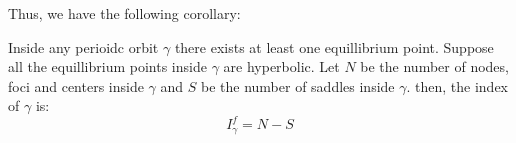 Thus, we have the following corollary:

\begin{corollary}
    Inside any perioidc orbit \(\gamma \) there exists at least one equillibrium point. Suppose
    all the equillibrium points inside \(\gamma \) are hyperbolic. Let \(N\) be the number of
    nodes, foci and centers inside \(\gamma \) and \(S\) be the number of saddles inside \(\gamma \).
    then, the index of \(\gamma \) is:
    \[
        I^f_\gamma = N - S
    \] 
\end{corollary}


